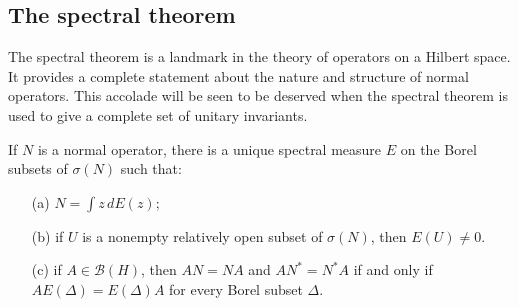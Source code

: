 \subsection{The spectral theorem}
The spectral theorem is a landmark in the theory of operators on a Hilbert space. It provides a complete statement about the nature and structure of normal operators. This accolade will be seen to be deserved when the spectral theorem is used to give a complete set of unitary invariants.
\begin{theorem}
If $N$ is a normal operator, there is a unique spectral measure $E$ on the Borel subsets of $\sigma(N)$ such that:
\begin{itemize}
\item[(a)] $N=\int z\,dE(z)$;
\item[(b)] if $U$ is a nonempty relatively open subset of $\sigma(N)$, then $E(U)\neq 0$. 
\item[(c)] if $A\in\mathcal{B}(H)$, then $AN=NA$ and $AN^*=N^*A$ if and only if $AE(\Delta)=E(\Delta)A$ for every Borel subset $\Delta$.
\end{itemize}
\end{theorem}

